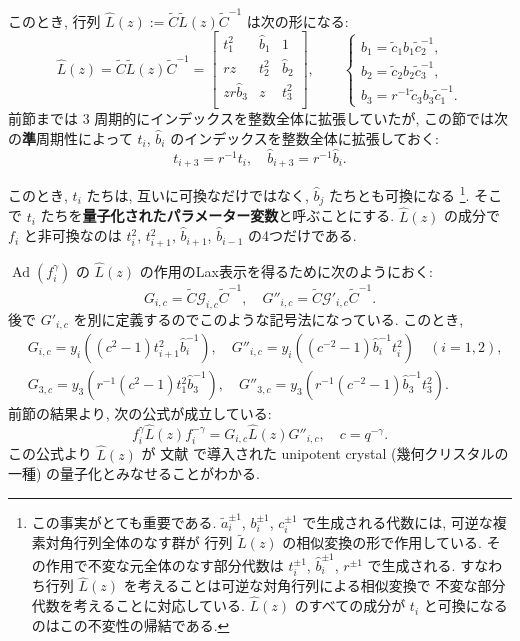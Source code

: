 \documentclass[12pt,twoside,dvipdfm]{msjproc}
\theoremstyle{definition} %
\theoremstyle{definition} %
\theoremstyle{definition} %
\numberwithin{theorem}{section}
\numberwithin{equation}{section}
\numberwithin{figure}{section}
\numberwithin{table}{section}
\newcommand\tL{{\widetilde{L}}}
\newcommand\cG{{\mathcal{G}}}
\newcommand\Ad{\mathop{\mathrm{Ad}}\nolimits}
\newcommand\tC{{\widetilde{C}}}
\newcommand\ta{{\tilde{a}}}
\newcommand\tc{{\tilde{c}}}
\newcommand\hL{{\widehat{L}}}
\newcommand\hb{{\hat{b}}}
\begin{document}
このとき, 行列 $\hL(z) := \tC \tL(z) \tC^{-1}$ は次の形になる:
\begin{equation*}
 \hL(z) = \tC \tL(z) \tC^{-1} =
 \begin{bmatrix}
   t_1^2   & \hb_1 & 1     \\
   rz      & t_2^2 & \hb_2 \\
   zr\hb_3 & z     & t_3^2 \\
 \end{bmatrix},
 \qquad
 \begin{cases}
  \hb_1 = \tc_1 b_1 \tc_2^{-1}, \\
  \hb_2 = \tc_2 b_2 \tc_3^{-1}, \\
  \hb_3 = r^{-1} \tc_3 b_3 \tc_1^{-1}.
 \end{cases}
\end{equation*}
前節までは $3$ 周期的にインデックスを整数全体に拡張していたが, 
この節では次の{\bf 準}周期性によって $t_i$, $\hb_i$ のインデックスを整数全体に拡張しておく:
\begin{equation*}
 t_{i+3} = r^{-1}t_i, \quad
 \hb_{i+3} = r^{-1} \hb_i.
\end{equation*}

このとき, $t_i$ たちは, 互いに可換なだけではなく, $\hb_j$ たちとも可換になる%
\footnote{この事実がとても重要である.
$\ta_i^{\pm1}$, $b_i^{\pm1}$, $c_i^{\pm1}$ で生成される代数には, 
可逆な複素対角行列全体のなす群が
行列 $\tL(z)$ の相似変換の形で作用している.
その作用で不変な元全体のなす部分代数は $t_i^{\pm1}$, $\hb_i^{\pm1}$, $r^{\pm1}$ で生成される.
すなわち行列 $\hL(z)$ を考えることは可逆な対角行列による相似変換で
不変な部分代数を考えることに対応している.
$\hL(z)$ のすべての成分が $t_i$ と可換になるのはこの不変性の帰結である.}.
そこで $t_i$ たちを{\bf 量子化されたパラメーター変数}と呼ぶことにする.
$\hL(z)$ の成分で $f_i$ と非可換なのは $t_i^2$, $t_{i+1}^2$, $\hb_{i+1}$, $\hb_{i-1}$ 
の4つだけである. 

$\Ad(f_i^\gamma)$ の $\hL(z)$ の作用のLax表示を得るために次のようにおく:
\begin{equation*}
 G_{i,c} = \tC \cG_{i,c} \tC^{-1}, \quad
 G''_{i,c} = \tC \cG'_{i,c} \tC^{-1}.
\end{equation*}
後で $G'_{i,c}$ を別に定義するのでこのような記号法になっている.
このとき, 
\begin{align*}
 &
 G_{i,c} = y_i((c^2-1)t_{i+1}^2 \hb_i^{-1}),   \quad
 G''_{i,c} = y_i((c^{-2}-1)\hb_i^{-1}t_i^2)  \quad
 (i=1,2),
 \\ &
 G_{3,c} = y_3(r^{-1}(c^2-1)t_1^2\hb_3^{-1}), \quad
 G''_{3,c} = y_3(r^{-1}(c^{-2}-1)\hb_3^{-1}t_3^2).
\end{align*}
前節の結果より, 次の公式が成立している:
\begin{equation*}
  f_i^\gamma \hL(z) f_i^{-\gamma} = G_{i,c} \hL(z) G''_{i,c}, \quad
  c = q^{-\gamma}.
\end{equation*}
この公式より $\hL(z)$ が
文献 \cite{BK-GC1} で導入された unipotent crystal (幾何クリスタルの一種)
の量子化とみなせることがわかる.
\end{document}
